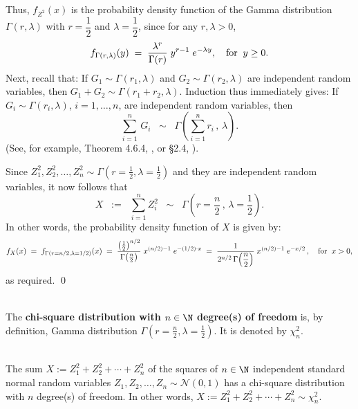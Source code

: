 \documentclass{article}
\begin{document}
Thus, $f_{Z^{2}}(x)$ is the probability density function of the Gamma distribution $\Gamma(r,\lambda)$ with $r = \dfrac{1}{2}$ and $\lambda=\dfrac{1}{2}$, since for any $r, \lambda > 0$,
\begin{equation*}
f_{\Gamma(r,\lambda)}(y) \; = \; \dfrac{\lambda^{r}}{\Gamma\!\left(r\right)} \; y^{r-1} \; e^{-\lambda y},
\quad\textnormal{for}\;\; y \geq 0.
\end{equation*}
Next, recall that: If $G_{1} \sim \Gamma(r_{1},\lambda)$ and $G_{2} \sim \Gamma(r_{2},\lambda)$ are independent random variables, then $G_{1} + G_{2} \sim \Gamma(r_{1}+r_{2},\lambda)$.  Induction thus immediately gives:  If $G_{i} \sim \Gamma(r_{i},\lambda)$, $i = 1, \ldots, n$, are independent random variables, then
\begin{equation*}
\overset{n}{\underset{i=1}{\sum}}\,G_{i} \;\; \sim \;\; \Gamma\!\left(\sum_{i=1}^{n}r_{i}\,,\,\lambda\right).
\end{equation*}
(See, for example, Theorem 4.6.4, \cite{LarsenMarx}, or \S2.4, \cite{Wasserman2004}).

\noindent
Since $Z_{1}^{2}, Z_{2}^{2}, \ldots, Z_{n}^{2} \sim \Gamma\!\left(r=\frac{1}{2},\lambda=\frac{1}{2}\right)$ and they are independent random variables, it now follows that
\begin{equation*}
X \;\; := \;\; \sum_{i=1}^{n} Z_{i}^{2} \;\; \sim \;\; \Gamma\!\left(r=\frac{n}{2}\,,\,\lambda=\frac{1}{2}\right).
\end{equation*}
In other words, the probability density function of $X$ is given by:
\begin{equation*}
         f_{X}(x) \; = \; f_{\Gamma(r=n/2,\lambda=1/2)}(x)
\; = \; \dfrac{\left(\frac{1}{2}\right)^{n/2}}{\Gamma\!\left(\frac{n}{2}\right)} \; x^{(n/2)-1} \; e^{-(1/2)\cdot x}
\; = \; \dfrac{1}{2^{n/2}\,\Gamma\!\left(\dfrac{n}{2}\right)} \; x^{(n/2)-1} \; e^{-x/2}\,,
\quad\textnormal{for}\;\; x > 0,
\end{equation*}
as required.  \qed

\begin{definition}\mbox{}\\
The \textbf{chi-square distribution with $n \in \N$ degree(s) of freedom} is, by definition,
Gamma distribution $\Gamma\!\left(r=\frac{n}{2},\lambda=\frac{1}{2}\right)$.
It is denoted by $\chi^{2}_{n}$.
\end{definition}

\begin{remark}\mbox{}\\
The sum $X := Z_{1}^{2} + Z_{2}^{2} + \cdots + Z_{n}^{2}$ of the squares of $n \in \N$ independent standard normal random variables $Z_{1}, Z_{2}, \ldots, Z_{n} \sim \mathcal{N}(0,1)$ has a chi-square distribution with $n$ degree(s) of freedom.  In other words,
$X := Z_{1}^{2} + Z_{2}^{2} + \cdots + Z_{n}^{2} \sim \chi^{2}_{n}$.
\end{remark}
\end{document}
